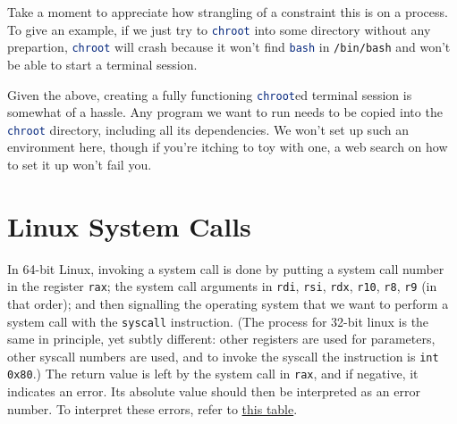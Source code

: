 \documentclass{article}
\newcommand{\xcode}[2]{\colorbox{ubuntuback}{\lstinline[language=#1]|#2|}}
\newcommand{\asm}[1]{\xcode{{[x86masm]assembler}}{#1}}
\begin{document}
Take a moment to appreciate how strangling of a constraint this is on a process. To give an example, if we just try to \xcode{bash}{chroot} into some directory without any prepartion, \xcode{bash}{chroot} will crash because it won't find \xcode{bash}{bash} in \xcode{bash}{/bin/bash} and won't be able to start a terminal session.

Given the above, creating a fully functioning \xcode{bash}{chroot}ed terminal session is somewhat of a hassle. Any program we want to run needs to be copied into the \xcode{bash}{chroot} directory, including all its dependencies. We won't set up such an environment here, though if you're itching to toy with one, a web search on how to set it up won't fail you.

\section{Linux System Calls}

In 64-bit Linux, invoking a system call is done by putting a system call number in the register \asm{rax}; the system call arguments in \asm{rdi}, \asm{rsi}, \asm{rdx}, \asm{r10}, \asm{r8}, \asm{r9} (in that order); and then signalling the operating system that we want to perform a system call with the \asm{syscall} instruction. (The process for 32-bit linux is the same in principle, yet subtly different: other registers are used for parameters, other syscall numbers are used, and to invoke the syscall the instruction is \asm{int 0x80}.) The return value is left by the system call in \asm{rax}, and if negative, it indicates an error. Its absolute value should then be interpreted as an error number. To interpret these errors, refer to \href{https://mariadb.com/kb/en/library/operating-system-error-codes/}{this table}.
\end{document}
